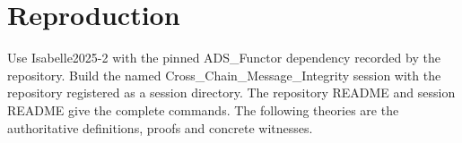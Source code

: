 \documentclass[11pt,a4paper]{article}
\begin{document}
\section{Reproduction}

Use Isabelle2025-2 with the pinned ADS\_Functor dependency recorded by the
repository. Build the named Cross\_Chain\_Message\_Integrity session with the
repository registered as a session directory. The repository README and
session README give the complete commands. The following theories are the
authoritative definitions, proofs and concrete witnesses.

\clearpage

\clearpage


\end{document}
